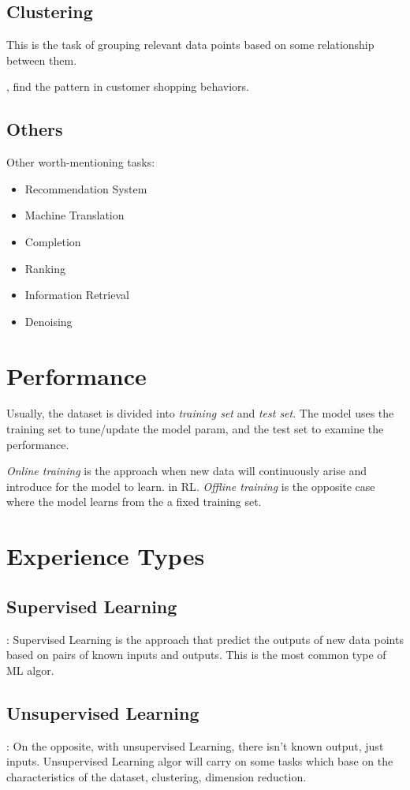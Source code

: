 \subsection{Clustering}
This is the task of grouping relevant data points based on some relationship between them.

\Eg, find the pattern in customer shopping behaviors.

\subsection{Others}
Other worth-mentioning tasks:
\begin{itemize}
	\item Recommendation System
	\item Machine Translation
	\item Completion
	\item Ranking
	\item Information Retrieval
	\item Denoising
\end{itemize}

\section{Performance}
Usually, the dataset is divided into \textit{training set} and \textit{test set}. The model uses the training set to tune/update the model \ac{param}, and the test set to examine the performance.

\textit{Online training} is the approach when new data will continuously arise and introduce for the model to learn. \Eg in \ac{RL}. \textit{Offline training} is the opposite case where the model learns from the a fixed training set.

\section{Experience Types}
\subsection{Supervised Learning}
: Supervised Learning is the approach that predict the outputs of new data points based on pairs of known inputs and outputs. This is the most common type of \ac{ML} \ac{algor}.
\subsection{Unsupervised Learning}
: On the opposite, with unsupervised Learning, there isn't known output, just inputs. Unsupervised Learning \ac{algor} will carry on some tasks which base on the characteristics of the dataset, \eg clustering, dimension reduction.
